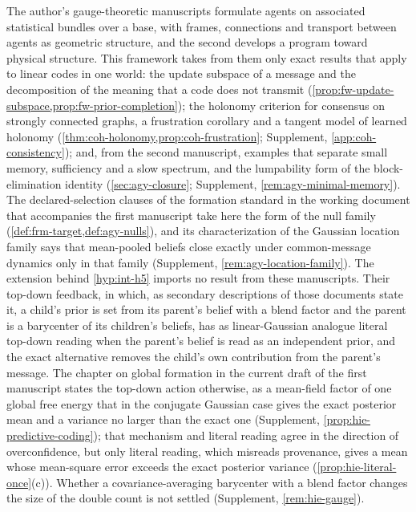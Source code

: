 The author's gauge-theoretic manuscripts \citep{dennis2026magent,dennis2026participatory} formulate agents on associated statistical bundles over a base, with frames, connections and transport between agents as geometric structure, and the second develops a program toward physical structure. This framework takes from them only exact results that apply to linear codes in one world: the update subspace of a message and the decomposition of the meaning that a code does not transmit (\cref{prop:fw-update-subspace,prop:fw-prior-completion}); the holonomy criterion for consensus on strongly connected graphs, a frustration corollary and a tangent model of learned holonomy (\cref{thm:coh-holonomy,prop:coh-frustration}; Supplement, \cref{app:coh-consistency}); and, from the second manuscript, examples that separate small memory, sufficiency and a slow spectrum, and the lumpability form of the block-elimination identity (\cref{sec:agy-closure}; Supplement, \cref{rem:agy-minimal-memory}). The declared-selection clauses of the formation standard in the working document that accompanies the first manuscript \citep{dennis2026formation} take here the form of the null family (\cref{def:frm-target,def:agy-nulls}), and its characterization of the Gaussian location family says that mean-pooled beliefs close exactly under common-message dynamics only in that family (Supplement, \cref{rem:agy-location-family}). The extension behind \cref{hyp:int-h5} imports no result from these manuscripts. Their top-down feedback, in which, as secondary descriptions of those documents state it, a child's prior is set from its parent's belief with a blend factor and the parent is a barycenter of its children's beliefs, has as linear-Gaussian analogue literal top-down reading when the parent's belief is read as an independent prior, and the exact alternative removes the child's own contribution from the parent's message. The chapter on global formation in the current draft of the first manuscript states the top-down action otherwise, as a mean-field factor of one global free energy that in the conjugate Gaussian case gives the exact posterior mean and a variance no larger than the exact one (Supplement, \cref{prop:hie-predictive-coding}); that mechanism and literal reading agree in the direction of overconfidence, but only literal reading, which misreads provenance, gives a mean whose mean-square error exceeds the exact posterior variance (\cref{prop:hie-literal-once}(c)). Whether a covariance-averaging barycenter with a blend factor changes the size of the double count is not settled (Supplement, \cref{rem:hie-gauge}).

